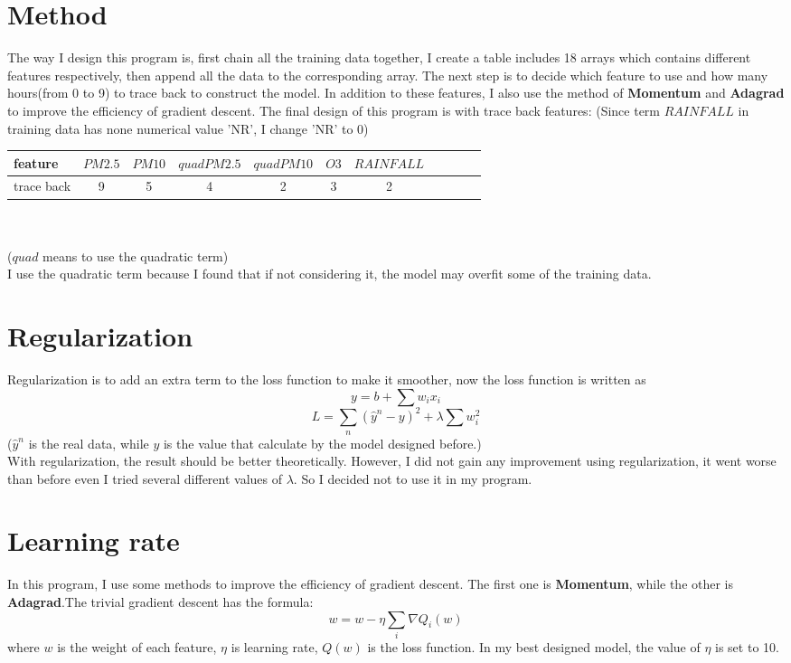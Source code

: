 \documentclass[11pt]{article}
\newcommand\n{\mbox{\qquad}}
\begin{document}
\section{Method}
\n The way I design this program is, first chain all the training data together, I create a table includes 18 arrays which contains different features respectively, then append all the data to the corresponding array. The next step is to decide which feature to use and how many hours(from 0 to 9) to trace back to construct the model. In addition to these features, I also use the method of \textbf{Momentum} and \textbf{Adagrad} to improve the efficiency of gradient descent. The final design of this program is with trace back features: (Since term $RAINFALL$ in training data has none numerical value 'NR', I change 'NR' to 0)\\
\begin{tabular}[t]{|l|c|c|c|c|c|c|c|c|c|c|}
	\hline
	feature & $PM2.5$ & $PM10$ & $quad PM2.5$ & $quad PM10$ & $O3$ &$RAINFALL$\\
	\hline 
	trace back & 9 & 5 & 4 & 2 & 3 & 2\\
	\hline
\end{tabular} 
\\ \\ 
\n ($quad$ means to use the quadratic term)\\
\n I use the quadratic term because I found that if not considering it, the model may overfit some of the training data.

\section{Regularization}
\n Regularization is to add an extra term to the loss function to make it smoother, now the loss function is written as
\[ y = b + \sum w_i x_i \]
\begin{equation}
	L = \sum_n (\widehat{y}^n - y)^2 + \lambda \sum w_i^2
\end{equation}
\n ($\widehat{y}^n$ is the real data, while $y$ is the value that calculate by the model designed before.)\\
	With regularization, the result should be better theoretically. However, I did not gain any improvement using regularization, it went worse than before even  I tried several different values of $\lambda$. So I decided not to use it in my program. 

\section{Learning rate}
\n In this program, I use some methods to improve the efficiency of gradient descent. The first one is \textbf{Momentum}, while the other is \textbf{Adagrad}.The trivial gradient descent has the formula:
	\begin{equation}
		w = w - \eta \sum_i \nabla Q_i(w)
	\end{equation}
where $w$ is the weight of each feature, $\eta$ is learning rate, $Q(w)$ is the loss function. In my best designed model, the value of $\eta$ is set to 10.
\end{document}
